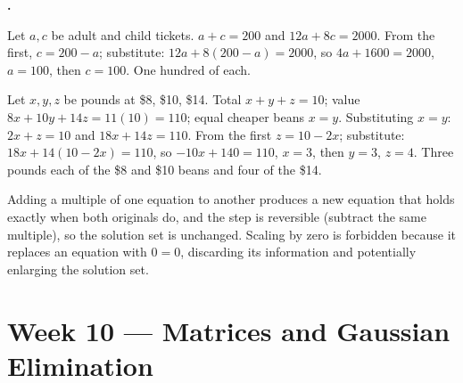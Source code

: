 \documentclass[12pt]{book}
\newcounter{soln}[section]
\newenvironment{solutions}{%
  \setcounter{soln}{0}%
  \begin{list}{\textbf{\arabic{soln}.}}{%
    \usecounter{soln}\setlength{\leftmargin}{2.2em}\setlength{\itemsep}{10pt}}%
}{\end{list}}
\begin{document}
\begin{solutions}
\item Let $a,c$ be adult and child tickets. $a+c=200$ and $12a+8c=2000$. From the
first, $c=200-a$; substitute: $12a+8(200-a)=2000$, so $4a+1600=2000$, $a=100$, then
$c=100$. One hundred of each.

\item Let $x,y,z$ be pounds at \$8, \$10, \$14. Total $x+y+z=10$; value
$8x+10y+14z=11(10)=110$; equal cheaper beans $x=y$. Substituting $x=y$:
$2x+z=10$ and $18x+14z=110$. From the first $z=10-2x$; substitute:
$18x+14(10-2x)=110$, so $-10x+140=110$, $x=3$, then $y=3$, $z=4$. Three pounds each of
the \$8 and \$10 beans and four of the \$14.

\item Adding a multiple of one equation to another produces a new equation that holds
exactly when both originals do, and the step is reversible (subtract the same
multiple), so the solution set is unchanged. Scaling by zero is forbidden because it
replaces an equation with $0=0$, discarding its information and potentially enlarging
the solution set.
\end{solutions}

\section*{Week 10 — Matrices and Gaussian Elimination}
\setcounter{section}{10}
\end{document}
